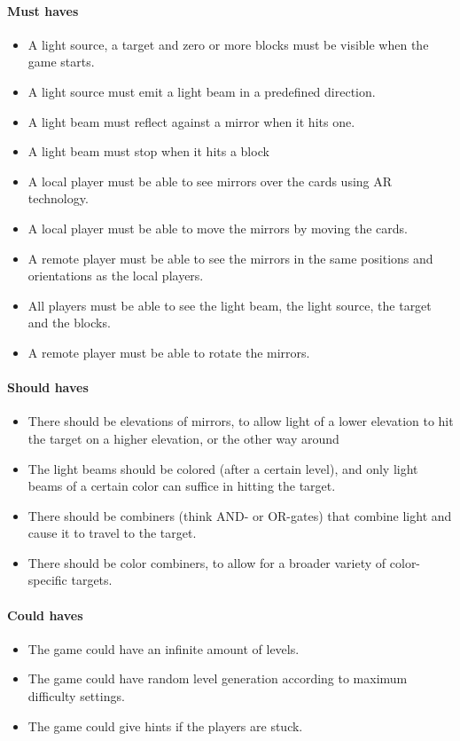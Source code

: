 \paragraph{Must haves}
\begin{itemize}
	\item A light source, a target and zero or more blocks must be visible when the game starts.
	\item A light source must emit a light beam in a predefined direction.
	\item A light beam must reflect against a mirror when it hits one.
	\item A light beam must stop when it hits a block
	\item A local player must be able to see mirrors over the cards using AR technology.
	\item A local player must be able to move the mirrors by moving the cards.
	\item A remote player must be able to see the mirrors in the same positions and 
		  orientations as the local players.
	\item All players must be able to see the light beam, the light source, the target and the blocks.
	\item A remote player must be able to rotate the mirrors.
\end{itemize}

\paragraph{Should haves}
\begin{itemize}
	\item There should be elevations of mirrors, to allow light of a lower elevation to hit the target on a higher elevation, or the other way around
	\item The light beams should be colored (after a certain level), and only light beams of a certain color can suffice in hitting the target.
	\item There should be combiners (think AND- or OR-gates) that combine light and cause it to travel to the target.
	\item There should be color combiners, to allow for a broader variety of color-specific targets.
\end{itemize}

\paragraph{Could haves}
\begin{itemize}
	\item The game could have an infinite amount of levels.
	\item The game could have random level generation according to maximum difficulty settings.
	\item The game could give hints if the players are stuck.
\end{itemize}

